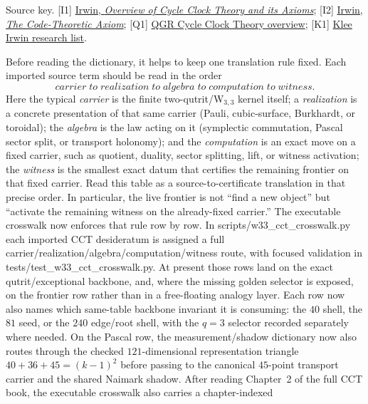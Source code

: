 \documentclass[12pt,a4paper]{article}
\def\textbf#1{#1}%
\def\texttt#1{#1}%
\def\text#1{#1}%
\def\to{ to }%
\theoremstyle{definition}
\begin{document}
\noindent\textbf{Source key.}
[I1] \href{https://www.altpropulsion.com/wp-content/uploads/2025/01/Klee-Irwin-Clock-Cycle-Theory-Jan2025.pdf}{Irwin, \emph{Overview of Cycle Clock Theory and its Axioms}};
[I2] \href{https://www.quantumgravityresearch.org/wp-content/uploads/2019/07/The-Code-Theoretic-Axiom-20190318.pdf}{Irwin, \emph{The Code-Theoretic Axiom}};
[Q1] \href{https://quantumgravityresearch.org/cycle-clock-theory-overview/}{QGR Cycle Clock Theory overview};
[K1] \href{https://kleeirwin.com/research/}{Klee Irwin research list}.

Before reading the dictionary, it helps to keep one translation rule
fixed.  Each imported source term should be read in the order
\[
\boxed{\text{carrier} \;\to\; \text{realization} \;\to\; \text{algebra} \;\to\; \text{computation} \;\to\; \text{witness}.}
\]
Here the typical \emph{carrier} is the finite two-qutrit/W$_{3,3}$
kernel itself; a \emph{realization} is a concrete presentation of that
same carrier (Pauli, cubic-surface, Burkhardt, or toroidal);
the \emph{algebra} is the law acting on it (symplectic commutation,
Pascal sector split, or transport holonomy); and the
\emph{computation} is an exact move on a fixed carrier, such as
quotient, duality, sector splitting, lift, or witness activation; the
\emph{witness} is the smallest exact datum that certifies the remaining
frontier on that fixed carrier.
Read this table as a source-to-certificate translation in that precise
order.  In particular, the live frontier is not ``find a new object''
but ``activate the remaining witness on the already-fixed carrier.''
The executable crosswalk now enforces that rule row by row.  In
\texttt{scripts/w33\_cct\_crosswalk.py} each imported CCT desideratum is
assigned a full carrier/realization/algebra/computation/witness route,
with focused validation in \texttt{tests/test\_w33\_cct\_crosswalk.py}.
At present those rows land on the exact qutrit/exceptional backbone,
and, where the missing golden selector is exposed, on the frontier row
rather than in a free-floating analogy layer.  Each row now also names
which same-table backbone invariant it is consuming: the $40$ shell, the
$81$ seed, or the $240$ edge/root shell, with the $q=3$ selector
recorded separately where needed.  On the Pascal row, the
measurement/shadow dictionary now also routes through the checked
$121$-dimensional representation triangle
$40+36+45=(k-1)^2$ before passing to the canonical $45$-point transport
carrier and the shared Naimark shadow.  After reading Chapter~2 of the
full CCT book, the executable crosswalk also carries a chapter-indexed
\end{document}
